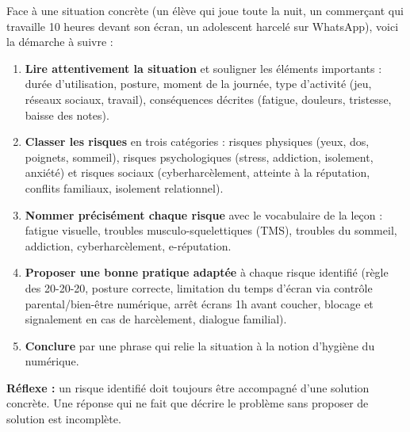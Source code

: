 \documentclass[11pt]{article}
\newcommand{\cle}[1]{{\popxbold\color{popdark}#1}}
\begin{document}
\begin{methode}
Face à une situation concrète (un élève qui joue toute la nuit, un commerçant qui travaille 10 heures devant son écran, un adolescent harcelé sur WhatsApp), voici la démarche à suivre :
\begin{enumerate}
\item \textbf{Lire attentivement la situation} et souligner les éléments importants : durée d'utilisation, posture, moment de la journée, type d'activité (jeu, réseaux sociaux, travail), conséquences décrites (fatigue, douleurs, tristesse, baisse des notes).
\item \textbf{Classer les risques} en trois catégories : risques \cle{physiques} (yeux, dos, poignets, sommeil), risques \cle{psychologiques} (stress, addiction, isolement, anxiété) et risques \cle{sociaux} (cyberharcèlement, atteinte à la réputation, conflits familiaux, isolement relationnel).
\item \textbf{Nommer précisément chaque risque} avec le vocabulaire de la leçon : \cle{fatigue visuelle}, \cle{troubles musculo-squelettiques (TMS)}, \cle{troubles du sommeil}, \cle{addiction}, \cle{cyberharcèlement}, \cle{e-réputation}.
\item \textbf{Proposer une bonne pratique adaptée} à chaque risque identifié (règle des 20-20-20, posture correcte, limitation du temps d'écran via contrôle parental/bien-être numérique, arrêt écrans 1h avant coucher, blocage et signalement en cas de harcèlement, dialogue familial).
\item \textbf{Conclure} par une phrase qui relie la situation à la notion d'\cle{hygiène du numérique}.
\end{enumerate}
\textbf{Réflexe :} un risque identifié doit toujours être accompagné d'une solution concrète. Une réponse qui ne fait que décrire le problème sans proposer de solution est incomplète.
\end{methode}
\end{document}
